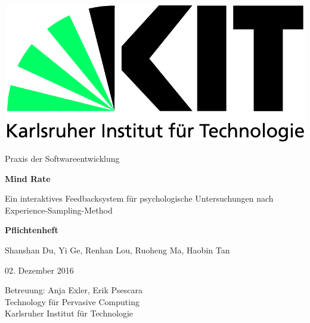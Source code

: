 \documentclass[a4paper]{scrreprt}
\begin{document}
 
    \begin{flushright}
        \includegraphics[scale = 0.7]{kit-logo.jpg}\\[0.5cm]
    \end{flushright}
    \vspace*{2cm} 

    \begin{center} \large 
    
        Praxis der Softwareentwicklung
        \vspace * {1.5cm}

        {\bf \huge Mind Rate}
		
        \vspace*{1cm}
		
        {\Large Ein interaktives Feedbacksystem f\"ur psychologische Untersuchungen nach Experience-Sampling-Method}
        \vspace*{1cm}

        {\bf \LARGE Pflichtenheft}
        \vspace*{2cm}

        Shanshan Du, Yi Ge, Renhan Lou, Ruoheng Ma, Haobin Tan
        \vspace*{1cm}

        02. Dezember 2016
        \vspace*{2.5cm}


        Betreuung: Anja Exler, Erik Psescara\\[1cm]
        Technology f\"ur Pervasive Computing\\[0.5cm]
        Karlsruher Institut für Technologie
    \end{center}
 
\end{document}
